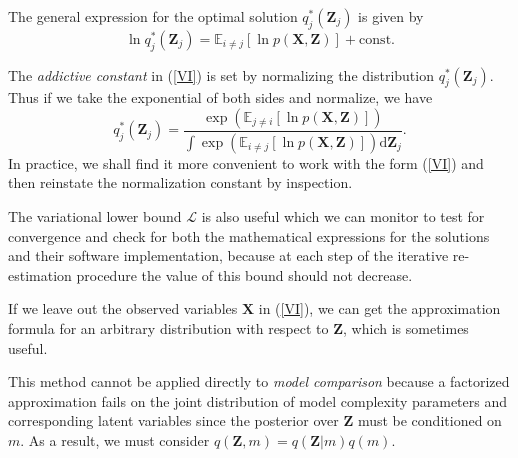 \documentclass[a4paper]{book}
\newcommand{\ud}{\mathrm{d}}
\newcommand{\up}{\mathrm}
\renewcommand{\bf}{\mathbf}
\renewcommand{\cal}{\mathcal}
\newcommand{\bb}{\mathbb}
\newcommand{\imp}[1]{\textit{#1}}
\begin{document}
The general expression for the optimal solution $q_j^*(\bf{Z}_j)$ is given by
\begin{equation}
	\ln q_j^*(\bf{Z}_j) = \bb{E}_{i \neq j} [\ln p(\bf{X,Z})] + \up{const}. \label{VI}
\end{equation}

The \imp{addictive constant} in (\ref{VI}) is set by normalizing the distribution $q_j^*(\bf{Z}_j)$. Thus if we take the exponential of both sides and normalize, we have
\begin{equation}
	q_j^*(\bf{Z}_j) = \frac{\exp(\bb{E}_{j\neq i}[\ln p(\bf{X,Z})])}{\int \exp(\bb{E}_{i\neq j}[\ln p(\bf{X,Z})])\ud \bf{Z}_j}.
\end{equation}
In practice, we shall find it more convenient to work with the form (\ref{VI}) and then reinstate the normalization constant by inspection. 

The variational lower bound $\cal{L}$ is also useful which we can monitor to test for convergence and check for both the mathematical expressions for the solutions and their software implementation, because at each step of the iterative re-estimation procedure the value of this bound should not decrease.

If we leave out the observed variables $\bf{X}$ in (\ref{VI}), we can get the approximation formula for an arbitrary distribution with respect to $\bf{Z}$, which is sometimes useful.

This method cannot be applied directly to \imp{model comparison} because a factorized approximation fails on the joint distribution of model complexity parameters and corresponding latent variables since the posterior over $\bf{Z}$ must be conditioned on $m$. As a result, we must consider $q(\bf{Z},m) = q(\bf{Z}|m)q(m)$.
\end{document}
